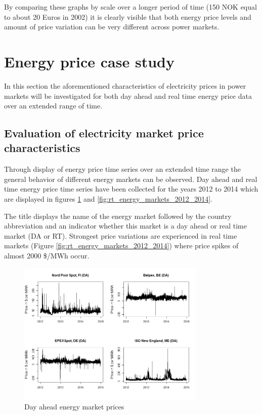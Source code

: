 By comparing these graphs by scale over a longer period of time (150 NOK equal to about 20 Euros in 2002) it is clearly visible that both energy price levels and amount of price variation can be very different across power markets. 


\section{Energy price case study}

In this section the aforementioned characteristics of electricity prices in power markets will be investigated for both day ahead and real time energy price data over an extended range of time. 


\subsection{Evaluation of electricity market price characteristics}

Through display of energy price time series over an extended time range the general behavior of different energy markets can be observed. Day ahead and real time energy price time series have been collected for the years 2012 to 2014 which are displayed in figures \ref{fig:da_energy_markets_2012_2014} and \ref{fig:rt_energy_markets_2012_2014}. 

The title displays the name of the energy market followed by the country abbreviation and an indicator whether this market is a day ahead or real time market (DA or RT). Strongest price variations are experienced in real time markets (Figure \ref{fig:rt_energy_markets_2012_2014}) where price spikes of almost 2000 \$/MWh occur. 


\begin{figure}[htbp]
	\centering
		\includegraphics[width=0.8\textwidth]{figures/data_analysis/da_energy_markets_2012_2014.png}
	\caption{Day ahead energy market prices}
	\label{fig:da_energy_markets_2012_2014}
\end{figure}

